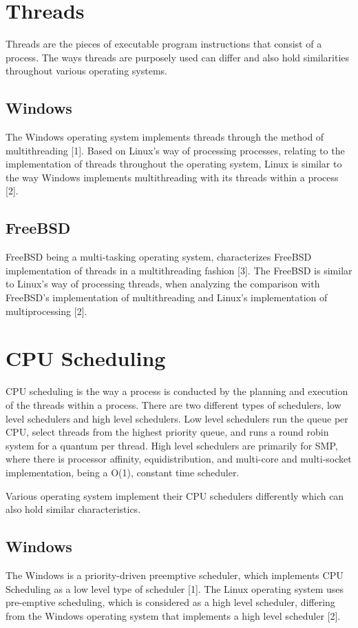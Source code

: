 \documentclass[letterpaper,10pt,onecolumn]{IEEEtran}
\begin{document}
\section*{Threads}
Threads are the pieces of executable program instructions that consist of a process. 
The ways threads are purposely used can differ and also hold similarities throughout various operating systems.

	\subsection*{Windows}
	The Windows operating system implements threads through the method of multithreading [1]. Based on Linux's way of processing processes, relating to the implementation of threads throughout the operating system, Linux is similar to the way Windows implements multithreading with its threads within a process [2].

	\subsection*{FreeBSD}
	FreeBSD being a multi-tasking operating system, characterizes FreeBSD implementation of threads	in a multithreading fashion [3]. The FreeBSD is similar to Linux's way of processing threads, when analyzing the comparison with FreeBSD's implementation of multithreading and Linux's implementation of multiprocessing [2].

\section*{CPU Scheduling}
CPU scheduling is the way a process is conducted by the planning and execution of the threads within a process. There are two different types of schedulers, low level schedulers and high level schedulers. Low level schedulers run the queue per CPU, select threads from the highest priority queue, and runs a round robin system for a quantum per thread. High level schedulers are primarily for SMP, where there is processor affinity, equidistribution, and multi-core and multi-socket implementation, being a O(1), constant time scheduler.
\par
Various operating system implement their CPU schedulers differently which can also hold similar characteristics.

	\subsection*{Windows}
	The Windows is a priority-driven preemptive scheduler, which implements CPU Scheduling as a low level type of scheduler [1]. The Linux operating system uses pre-emptive scheduling, which is considered as a high level scheduler, differing from the Windows operating system that implements a high level scheduler [2].
\end{document}
